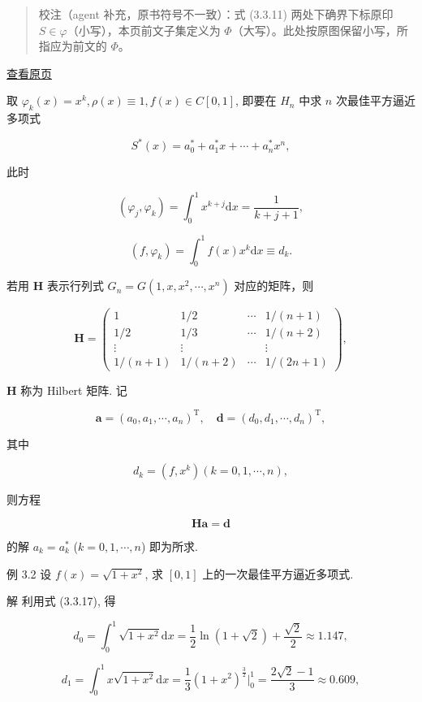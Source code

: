 \documentclass[
  10pt,
  fontset=fandol]{ctexart}
\begin{document}
\begin{quote}
校注（agent 补充，原书符号不一致）：式 (3.3.11) 两处下确界下标原印 \(S\in\varphi\)（小写），本页前文子集定义为 \(\Phi\)（大写）。此处按原图保留小写，所指应为前文的 \(\Phi\)。
\end{quote}

\href{../../source-images/pdf-069.jpeg}{查看原页}

取 \(\varphi_k(x) = x^k, \rho(x) \equiv 1, f(x) \in C[0,1]\), 即要在 \(H_n\) 中求 \(n\) 次最佳平方逼近多项式

\[
S^*(x) = a_0^* + a_1^* x + \cdots + a_n^* x^n,
\]

此时

\[
(\varphi_j, \varphi_k) = \int_0^1 x^{k+j} \mathrm{d}x = \frac{1}{k+j+1},
\]

\[
(f, \varphi_k) = \int_0^1 f(x) x^k \mathrm{d}x \equiv d_k.
\]

若用 \(\boldsymbol{H}\) 表示行列式 \(G_n = G(1, x, x^2, \cdots, x^n)\) 对应的矩阵，则

\[\boldsymbol{H} = \begin{pmatrix}
1 & 1/2 & \cdots & 1/(n+1) \\
1/2 & 1/3 & \cdots & 1/(n+2) \\
\vdots & \vdots & & \vdots \\
1/(n+1) & 1/(n+2) & \cdots & 1/(2n+1)
\end{pmatrix}, \tag{3.3.16}
\]

\(\boldsymbol{H}\) 称为 Hilbert 矩阵. 记

\[
\boldsymbol{a} = (a_0, a_1, \cdots, a_n)^{\mathrm{T}}, \quad \boldsymbol{d} = (d_0, d_1, \cdots, d_n)^{\mathrm{T}},
\]

其中

\[
d_k = (f, x^k) (k=0, 1, \cdots, n), \tag{3.3.17}
\]

则方程

\[\boldsymbol{H}\boldsymbol{a}=\boldsymbol{d}
\]

的解 \(a_k = a_k^*\) (\(k=0, 1, \cdots, n\)) 即为所求.

例 3.2 设 \(f(x) = \sqrt{1+x^2}\), 求 \([0,1]\) 上的一次最佳平方逼近多项式.

解 利用式 (3.3.17), 得

\[
d_0 = \int_0^1 \sqrt{1+x^2} \mathrm{d}x = \frac{1}{2} \ln(1+\sqrt{2}) + \frac{\sqrt{2}}{2} \approx 1.147,
\]

\[
d_1 = \int_0^1 x \sqrt{1+x^2} \mathrm{d}x = \frac{1}{3} (1+x^2)^{\frac{3}{2}} \Bigg|_0^1 = \frac{2\sqrt{2}-1}{3} \approx 0.609,
\]
\end{document}
